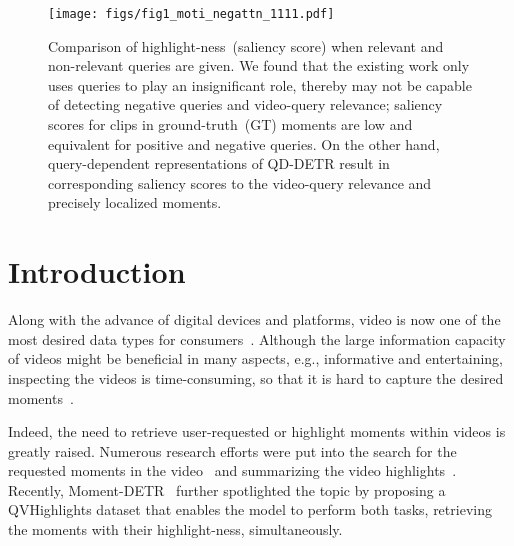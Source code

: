 \begin{figure}
    \centering
    \texttt{[image: figs/fig1\_moti\_negattn\_1111.pdf]}
\vspace{-0.6cm}
    \caption{
Comparison of highlight-ness~(saliency score) when relevant and non-relevant queries are given.
        We found that the existing work only uses queries to play an insignificant role, thereby may not be capable of detecting negative queries and video-query relevance; saliency scores for clips in ground-truth~(GT) moments are low and equivalent for positive and negative queries.
On the other hand, query-dependent representations of QD-DETR result in corresponding saliency scores to the video-query relevance and precisely localized moments.
}
    \label{fig:motivation_ex}
\end{figure}


\section{Introduction}
Along with the advance of digital devices and platforms, video is now one of the most desired data types for consumers~\cite{apostolidis2021video,wu2017deep}.
Although the large information capacity of videos might be beneficial in many aspects, e.g., informative and entertaining, inspecting the videos is time-consuming, so that it is hard to capture the desired moments~\cite{anne2017localizing,apostolidis2021video}. 



Indeed, the need to retrieve user-requested or highlight moments within videos is greatly raised.
Numerous research efforts were put into the search for the requested moments in the video~\cite{anne2017localizing, gao2017tall, liu2015multi, escorcia2019temporal} and summarizing the video highlights~\cite{zhang2016video, mahasseni2017unsupervised, badamdorj2022contrastive, wei2022learning}.
Recently, Moment-DETR~\cite{momentdetr} further spotlighted the topic by proposing a QVHighlights dataset that enables the model to perform both tasks, retrieving the moments with their highlight-ness, simultaneously.



















